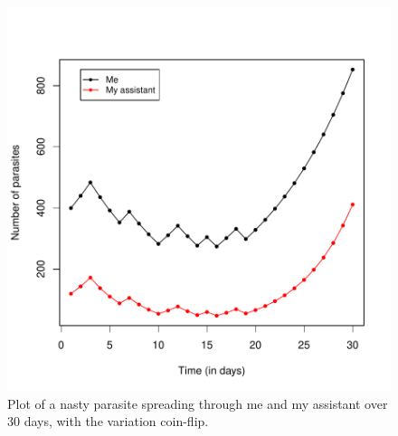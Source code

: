 \documentclass[11pt, oneside, reqno]{article}
\begin{document}
\begin{figure}
\begin{center}
\includegraphics{exercises-diseasevar}
\end{center}
\caption{Plot of a nasty parasite spreading through me and my assistant over 30 days, with the variation coin-flip.}
\label{fig:diseasevar}
\end{figure}
\eans
\end{document}
